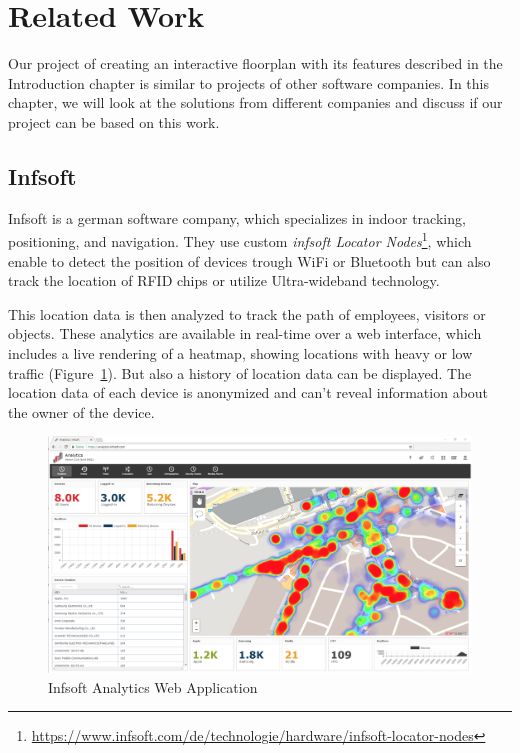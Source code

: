 \section{Related Work}

Our project of creating an interactive floorplan with its features described in the Introduction chapter is similar to projects of other software companies. In this chapter, we will look at the solutions from different companies and discuss if our project can be based on this work.

\subsection{Infsoft}

Infsoft is a german software company, which specializes in indoor tracking, positioning, and navigation. They use custom \emph{infsoft Locator Nodes}\footnote{\url{https://www.infsoft.com/de/technologie/hardware/infsoft-locator-nodes}}, which enable to detect the position of devices trough WiFi or Bluetooth but can also track the location of RFID chips or utilize Ultra-wideband technology.

This location data is then analyzed to track the path of employees, visitors or objects. These analytics are available in real-time over a web interface, which includes a live rendering of a heatmap, showing locations with heavy or low traffic (Figure~\ref{fig:InfsoftApplication}). But also a history of location data can be displayed. The location data of each device is anonymized and can't reveal information about the owner of the device. 

\begin{figure}[!hb]
    \centering
    \includegraphics[width=0.9\linewidth]{images/Infsoft}
    \caption{Infsoft Analytics Web Application}
    \label{fig:InfsoftApplication}
\end{figure}

